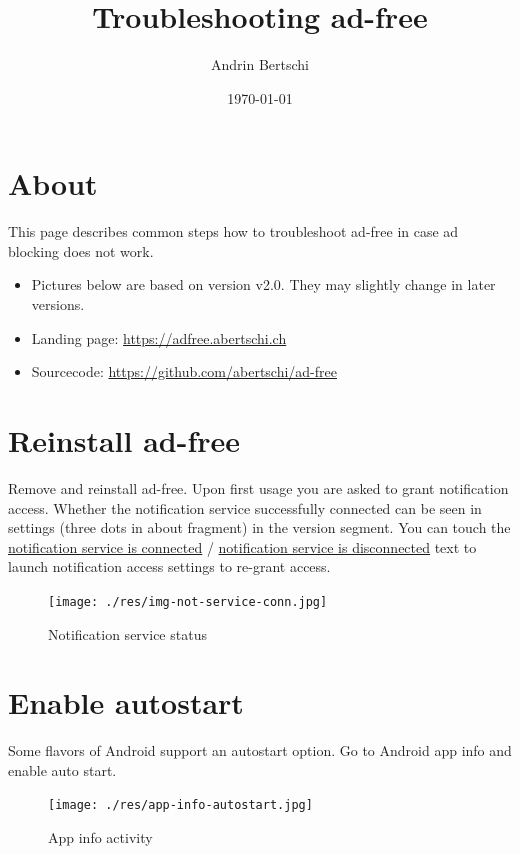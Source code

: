 \documentclass[11pt]{article}
\author{Andrin Bertschi}
\date{\today}
\title{Troubleshooting ad-free}
\begin{document}
\maketitle
\tableofcontents



\section{About}
\label{sec:orge76b993}
This page describes common steps how to troubleshoot ad-free in case
ad blocking does not work.

\begin{itemize}
\item Pictures below are based on version v2.0. They may slightly change in later versions.

\item Landing page: \url{https://adfree.abertschi.ch}

\item Sourcecode: \url{https://github.com/abertschi/ad-free}
\end{itemize}

\section{Reinstall ad-free}
\label{sec:org1592811}
Remove and reinstall ad-free. Upon first usage you are asked to grant
notification access. Whether the notification service successfully
connected can be seen in settings (three dots in about fragment) in
the version segment. You can touch the \uline{notification service is
connected} / \uline{notification service is disconnected} text to launch
notification access settings to re-grant access.

\begin{figure}[htbp]
\centering
\texttt{[image: ./res/img-not-service-conn.jpg]}
\caption{Notification service status}
\end{figure}

\section{Enable autostart}
\label{sec:org6369766}
Some flavors of Android support an autostart option. Go to Android app info
and enable auto start.

\begin{figure}[htbp]
\centering
\texttt{[image: ./res/app-info-autostart.jpg]}
\caption{App info activity}
\end{figure}
\end{document}
